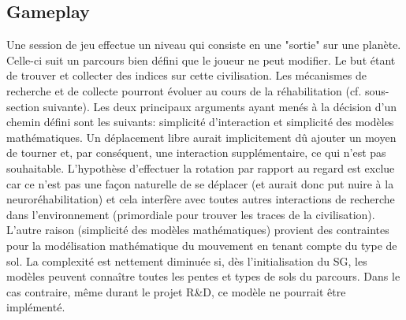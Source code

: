 		\begin{minipage}{\linewidth}
			\label{Maquette}
		\end{minipage}\medskip		
		
	\subsection*{Gameplay}
		Une session de jeu effectue un niveau qui consiste en une "sortie" sur une planète. Celle-ci suit un parcours bien défini que le joueur ne peut modifier. Le but étant de trouver et collecter des indices sur cette civilisation. Les mécanismes de recherche et de collecte pourront évoluer au cours de la réhabilitation (cf. sous-section suivante). Les deux principaux arguments ayant menés à la décision d'un chemin défini sont les suivants: simplicité d'interaction et simplicité des modèles mathématiques. Un déplacement libre aurait implicitement dû ajouter un moyen de tourner et, par conséquent, une interaction supplémentaire, ce qui n'est pas souhaitable. L'hypothèse d'effectuer la rotation par rapport au regard est exclue car ce n'est pas une façon naturelle de se déplacer (et aurait donc put nuire à la neuroréhabilitation) et cela interfère avec toutes autres interactions de recherche dans l'environnement (primordiale pour trouver les traces de la civilisation). L'autre raison (simplicité des modèles mathématiques) provient des contraintes pour la modélisation mathématique du mouvement en tenant compte du type de sol. La complexité est nettement diminuée si, dès l'initialisation du SG, les modèles peuvent connaître toutes les pentes et types de sols du parcours. Dans le cas contraire, même durant le projet R\&D, ce modèle ne pourrait être implémenté.
		\\
		
